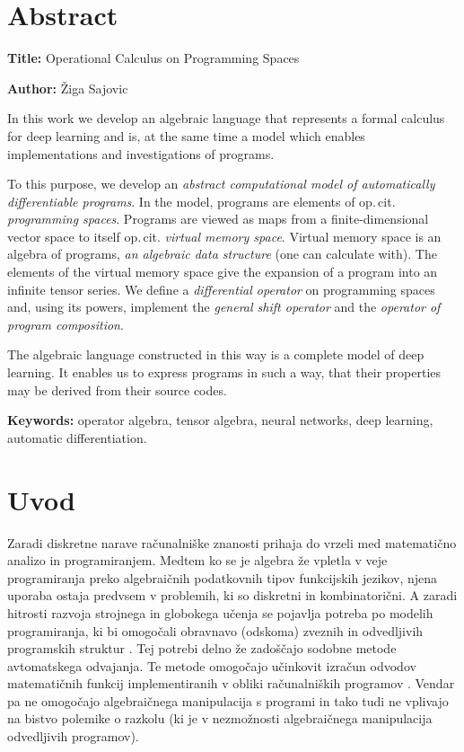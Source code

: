 \documentclass[a4paper, 12pt]{book}
\newcommand{\ttitleEn}{Operational Calculus on Programming Spaces}
\newcommand{\tauthor}{Žiga Sajovic}
\newcommand{\tkeywordsEn}{operator algebra, tensor algebra, neural networks, deep learning, automatic differentiation}
\newcommand{\clearemptydoublepage}{\newpage{\pagestyle{empty}\cleardoublepage}}
\begin{document}
\chapter*{Abstract}

\noindent\textbf{Title:} \ttitleEn
\bigskip

\noindent\textbf{Author:} \tauthor
\bigskip

\noindent 
In this work we develop an algebraic language that represents a formal calculus for deep learning and is, at the same time a model which enables implementations and investigations of programs.

To this purpose, we develop an \emph{abstract computational model of automatically differentiable programs}. In the model, programs are elements of op.\,cit. \emph{programming spaces}. Programs are viewed as maps from a finite-dimensional vector space to itself op.\,cit. \emph{virtual memory space}. Virtual memory space is an algebra of programs, \emph{an algebraic data structure} (one can calculate with). The elements of the virtual memory space give the expansion of a program into an infinite tensor series. We define a \emph{differential operator} on programming spaces and, using its powers, implement the \emph{general shift operator} and the \emph{operator of program composition}.

The algebraic language constructed in this way is a complete model of deep learning. It enables us to express programs in such a way, that their properties may be derived from their source codes.

\bigskip

\noindent\textbf{Keywords:} \tkeywordsEn.
\clearemptydoublepage

\mainmatter
\setcounter{page}{1}
\pagestyle{fancy}

\chapter{Uvod}

Zaradi diskretne narave računalniške znanosti prihaja do vrzeli med matematično analizo in programiranjem. Medtem ko se je algebra že vpletla v veje programiranja preko algebraičnih podatkovnih tipov funkcijskih jezikov, njena uporaba ostaja predvsem v problemih, ki so diskretni in kombinatorični. A zaradi hitrosti razvoja strojnega in globokega učenja se pojavlja potreba po modelih programiranja, ki bi omogočali obravnavo (odskoma) zveznih in odvedljivih programskih struktur \cite{AdSurvey}. Tej potrebi delno že zadoščajo sodobne metode avtomatskega odvajanja. Te metode omogočajo učinkovit izračun odvodov matematičnih funkcij implementiranih v obliki računalniških programov \cite{AD1}. Vendar pa ne omogočajo algebraičnega manipulacija s programi in tako tudi ne vplivajo na bistvo polemike o razkolu (ki je v nezmožnosti algebraičnega manipulacija odvedljivih programov).
\end{document}
